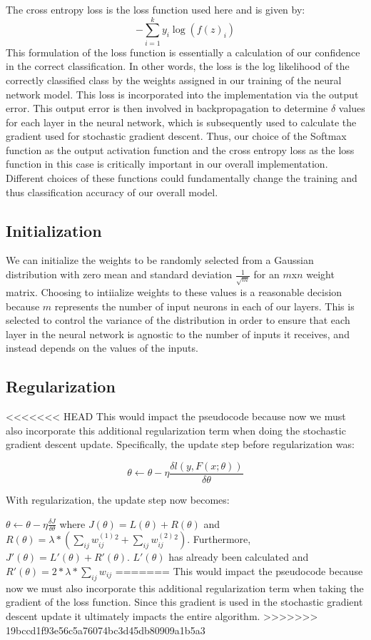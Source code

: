 \documentclass{article}
\begin{document}
The cross entropy loss is the loss function used here and is given by:
$$-\sum_{i=1}^k y_i \log(f(z)_i)$$
This formulation of the loss function is essentially a calculation of our confidence in the correct classification. In other words, the loss is the log likelihood of the correctly classified class by the weights assigned in our training of the neural network model. This loss is incorporated into the implementation via the output error. This output error is then involved in backpropagation to determine $\delta$ values for each layer in the neural network, which is subsequently used to calculate the gradient used for stochastic gradient descent. Thus, our choice of the Softmax function as the output activation function and the cross entropy loss as the loss function in this case is critically important in our overall implementation. Different choices of these functions could fundamentally change the training and thus classification accuracy of our overall model.

\subsection{Initialization}
We can initialize the weights to be randomly selected from a Gaussian distribution with zero mean and standard deviation $\frac{1}{\sqrt{m}}$ for an $m$x$n$ weight matrix. Choosing to intiialize weights to these values is a reasonable decision because $m$ represents the number of input neurons in each of our layers. This is selected to control the variance of the distribution in order to ensure that each layer in the neural network is agnostic to the number of inputs it receives, and instead depends on the values of the inputs.

\subsection{Regularization}
<<<<<<< HEAD
This would impact the pseudocode because now we must also incorporate this additional regularization term when doing the stochastic gradient descent update. Specifically, the update step before regularization was:

$$\theta \leftarrow \theta - \eta \frac{\delta l(y,F(x;\theta))}{\delta \theta}$$

With regularization, the update step now becomes:

$\theta \leftarrow \theta - \eta \frac{\delta J}{\delta \theta}$ where $J(\theta) = L(\theta) + R(\theta)$ and $R(\theta) = \lambda *(\sum_{ij} w_{ij}^{(1)}^2 + \sum_{ij} w_{ij}^{(2)}^2)$. Furthermore, $J'(\theta) = L'(\theta) + R'(\theta)$. $L'(\theta)$ has already been calculated and $R'(\theta) = 2* \lambda * \sum_{ij} w_{ij}$
=======
This would impact the pseudocode because now we must also incorporate this additional regularization term when taking the gradient of the loss function. Since this gradient is used in the stochastic gradient descent update it ultimately impacts the entire algorithm.
>>>>>>> 19bccd1f93e56c5a76074bc3d45db80909a1b5a3
\end{document}
